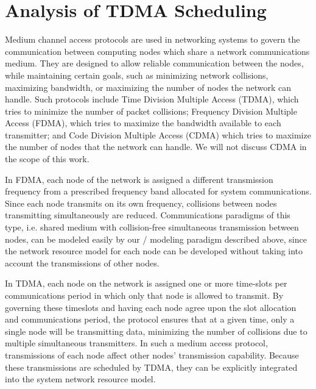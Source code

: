 \section{Analysis of TDMA Scheduling}
\label{sec:tdma}

Medium channel access protocols are used in networking systems to
govern the communication between computing nodes which share a network
communications medium.  They are designed to allow reliable
communication between the nodes, while maintaining certain goals, such
as minimizing network collisions, maximizing bandwidth, or maximizing
the number of nodes the network can handle.  Such protocols include
Time Division Multiple Access (TDMA), which tries to minimize the
number of packet collisions; Frequency Division Multiple Access
(FDMA), which tries to maximize the bandwidth available to each
transmitter; and Code Division Multiple Access (CDMA) which tries to
maximize the number of nodes that the network can
handle\cite{jung1993advantagesCDMAFDMATDMA}.  We will not discuss CDMA
in the scope of this work.

In FDMA, each node of the network is assigned a different transmission
frequency from a prescribed frequency band allocated for system
communications.  Since each node transmits on its own frequency,
collisions between nodes transmitting simultaneously are reduced.
Communications paradigms of this type, i.e. shared medium with
collision-free simultaneous transmission between nodes, can be modeled
easily by our \shorttool/ modeling paradigm described above, since the
network resource model for each node can be developed without taking
into account the transmissions of other nodes.

In TDMA, each node on the network is assigned one or more time-slots
per communications period in which only that node is allowed to
transmit.  By governing these timeslots and having each node agree
upon the slot allocation and communications period, the protocol
ensures that at a given time, only a single node will be transmitting
data, minimizing the number of collisions due to multiple simultaneous
transmitters.  In such a medium access protocol, transmissions of each
node affect other nodes' transmission capability.  Because these
transmissions are scheduled by TDMA, they can be explicitly integrated
into the system network resource model.

